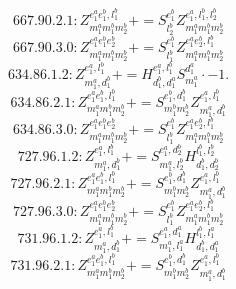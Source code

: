 \documentclass[letterpaper,10pt,fleqn,leqno,onecolumn]{article}
\begin{document}
\begin{equation} \;\;\;\;\;\;  667.90.2.1: Z^{e_{1}^{a}e_{1}^{b},l_{1}^{b}}_{m_{1}^{a}m_{1}^{b}m_{2}^{b}}+=S^{e_{1}^{b}}_{l_{2}^{b}}Z^{e_{1}^{a},l_{1}^{b},l_{2}^{b}}_{m_{1}^{a}m_{1}^{b}m_{2}^{b}} \end{equation}
\begin{equation} \;\;\;\;\;\;  667.90.3.0: Z^{e_{1}^{a}e_{1}^{b}e_{2}^{b}}_{m_{1}^{a}m_{1}^{b}m_{2}^{b}}+=S^{e_{1}^{b}}_{l_{1}^{b}}Z^{e_{1}^{a}e_{2}^{b},l_{1}^{b}}_{m_{1}^{a}m_{1}^{b}m_{2}^{b}} \end{equation}
\begin{equation} \;\;\;\;\;\;  634.86.1.2: Z^{e_{1}^{a},l_{1}^{b}}_{m_{1}^{a},d_{1}^{b}}+=H^{e_{1}^{a},l_{1}^{b}}_{d_{1}^{b},d_{1}^{a}}S^{d_{1}^{a}}_{m_{1}^{a}}\cdot -1. \end{equation}
\begin{equation} \;\;\;\;\;\;  634.86.2.1: Z^{e_{1}^{a}e_{1}^{b},l_{1}^{b}}_{m_{1}^{a}m_{1}^{b}m_{2}^{b}}+=S^{e_{1}^{b},d_{1}^{b}}_{m_{1}^{b}m_{2}^{b}}Z^{e_{1}^{a},l_{1}^{b}}_{m_{1}^{a},d_{1}^{b}} \end{equation}
\begin{equation} \;\;\;\;\;\;  634.86.3.0: Z^{e_{1}^{a}e_{1}^{b}e_{2}^{b}}_{m_{1}^{a}m_{1}^{b}m_{2}^{b}}+=S^{e_{1}^{b}}_{l_{1}^{b}}Z^{e_{1}^{a}e_{2}^{b},l_{1}^{b}}_{m_{1}^{a}m_{1}^{b}m_{2}^{b}} \end{equation}
\begin{equation} \;\;\;\;\;\;  727.96.1.2: Z^{e_{1}^{a},l_{1}^{b}}_{m_{1}^{a},d_{1}^{b}}+=S^{e_{1}^{a},d_{2}^{b}}_{m_{1}^{a},l_{2}^{b}}H^{l_{1}^{b},l_{2}^{b}}_{d_{1}^{b},d_{2}^{b}} \end{equation}
\begin{equation} \;\;\;\;\;\;  727.96.2.1: Z^{e_{1}^{a}e_{1}^{b},l_{1}^{b}}_{m_{1}^{a}m_{1}^{b}m_{2}^{b}}+=S^{e_{1}^{b},d_{1}^{b}}_{m_{1}^{b}m_{2}^{b}}Z^{e_{1}^{a},l_{1}^{b}}_{m_{1}^{a},d_{1}^{b}} \end{equation}
\begin{equation} \;\;\;\;\;\;  727.96.3.0: Z^{e_{1}^{a}e_{1}^{b}e_{2}^{b}}_{m_{1}^{a}m_{1}^{b}m_{2}^{b}}+=S^{e_{1}^{b}}_{l_{1}^{b}}Z^{e_{1}^{a}e_{2}^{b},l_{1}^{b}}_{m_{1}^{a}m_{1}^{b}m_{2}^{b}} \end{equation}
\begin{equation} \;\;\;\;\;\;  731.96.1.2: Z^{e_{1}^{a},l_{1}^{b}}_{m_{1}^{a},d_{1}^{b}}+=S^{e_{1}^{a},d_{1}^{a}}_{m_{1}^{a},l_{1}^{a}}H^{l_{1}^{b},l_{1}^{a}}_{d_{1}^{b},d_{1}^{a}} \end{equation}
\begin{equation} \;\;\;\;\;\;  731.96.2.1: Z^{e_{1}^{a}e_{1}^{b},l_{1}^{b}}_{m_{1}^{a}m_{1}^{b}m_{2}^{b}}+=S^{e_{1}^{b},d_{1}^{b}}_{m_{1}^{b}m_{2}^{b}}Z^{e_{1}^{a},l_{1}^{b}}_{m_{1}^{a},d_{1}^{b}} \end{equation}
\end{document}
